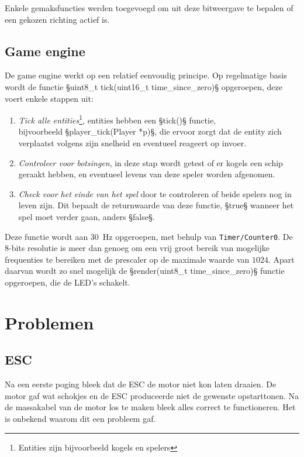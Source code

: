 \documentclass[12pt]{ugentreport}
\begin{document}
Enkele gemaksfuncties werden toegevoegd om uit deze bitweergave te bepalen of
een gekozen richting actief is.

\subsection{Game engine}
De game engine werkt op een relatief eenvoudig principe.
Op regelmatige basis wordt de functie §uint8_t tick(uint16_t time_since_zero)§
opgeroepen, deze voert enkele stappen uit:
\begin{enumerate}
  \item \emph{Tick alle entities}\footnote{Entities zijn bijvoorbeeld kogels en
        spelers}, entities hebben een §tick()§ functie,\\
    bijvoorbeeld §player_tick(Player *p)§, die ervoor zorgt dat de entity zich
    verplaatst volgens zijn snelheid en eventueel reageert op invoer.

  \item \emph{Controleer voor botsingen}, in deze stap wordt getest of er
    kogels een schip geraakt hebben, en eventueel levens van deze speler worden
    afgenomen.

  \item \emph{Check voor het einde van het spel} door te controleren of beide
    spelers nog in leven zijn. Dit bepaalt de returnwaarde van deze functie,
    §true§ wanneer het spel moet verder gaan, anders §false§.
\end{enumerate}

Deze functie wordt aan \SI{30}{\hertz} opgeroepen, met behulp van
\texttt{Timer/Counter0}. De 8-bits resolutie is meer dan genoeg om een vrij
groot bereik van mogelijke frequenties te bereiken met de prescaler op de
maximale waarde van $1024$.
Apart daarvan wordt zo snel mogelijk de §render(uint8_t time_since_zero)§
functie opgeroepen, die de LED's schakelt.

\section{Problemen}
\subsection{ESC}
Na een eerste poging bleek dat de ESC de motor niet kon laten draaien.
De motor gaf wat schokjes en de ESC produceerde niet de gewenste opstarttonen.
Na de massakabel van de motor los te maken bleek alles correct te functioneren.
Het is onbekend waarom dit een probleem gaf.
\end{document}
